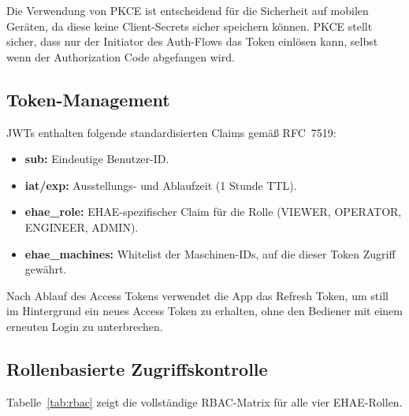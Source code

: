 ﻿\documentclass[12pt,a4paper]{article}
\begin{document}
Die Verwendung von PKCE \cite{rfc7636} ist entscheidend für die Sicherheit auf mobilen
Geräten, da diese keine Client-Secrets sicher speichern können. PKCE stellt sicher, dass
nur der Initiator des Auth-Flows das Token einlösen kann, selbst wenn der Authorization
Code abgefangen wird.

\subsection{Token-Management}

JWTs enthalten folgende standardisierten Claims gemä\ss{} RFC~7519:

\begin{itemize}[leftmargin=2em]
  \item \textbf{sub:} Eindeutige Benutzer-ID.
  \item \textbf{iat/exp:} Ausstellungs- und Ablaufzeit (1 Stunde TTL).
  \item \textbf{ehae\_role:} EHAE-spezifischer Claim für die Rolle (VIEWER, OPERATOR,
    ENGINEER, ADMIN).
  \item \textbf{ehae\_machines:} Whitelist der Maschinen-IDs, auf die dieser Token
    Zugriff gewährt.
\end{itemize}

Nach Ablauf des Access Tokens verwendet die App das Refresh Token, um still im
Hintergrund ein neues Access Token zu erhalten, ohne den Bediener mit einem erneuten
Login zu unterbrechen.

\subsection{Rollenbasierte Zugriffskontrolle}

Tabelle~\ref{tab:rbac} zeigt die vollständige RBAC-Matrix für alle vier EHAE-Rollen.
\end{document}
